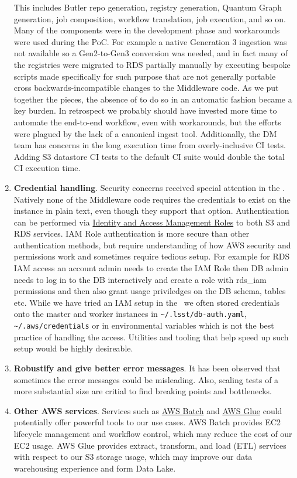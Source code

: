 \begin{enumerate}
This includes Butler repo generation, registry generation, Quantum Graph generation, job composition, workflow translation, job execution, and so on.
Many of the components were in the development phase and workarounds were used during the PoC.
For example a native Generation 3 ingestion was not available so a Gen2-to-Gen3 conversion was needed, and in fact many of the registries were migrated to RDS partially manually by executing bespoke scripts made specifically for such purpose that are not generally portable cross backwards-incompatible changes to the Middleware code.
As we put together the pieces, the absence of to do so in an automatic fashion became a key burden.
In retrospect we probably should have invested more time to automate the end-to-end workflow, even with workarounds, but the efforts were plagued by the lack of a canonical ingest tool.
Additionally, the DM team has concerns in the long execution time from overly-inclusive CI tests.
Adding S3 datastore CI tests to the default CI suite would double the total CI execution time.
\item \textbf{Credential handling}.
Security concerns received special attention in the \poc.
Natively none of the Middleware code requires the credentials to exist on the instance in plain text, even though they support that option.
Authentication can be performed via \href{https://docs.aws.amazon.com/IAM/latest/UserGuide/id_roles.html}{Identity and Access Management Roles} to both S3 and RDS services.
IAM Role authentication is more secure than other authentication methods, but require understanding of how AWS security and permissions work and sometimes require tedious setup.
For example for RDS IAM access an account admin needs to create the IAM Role then DB admin needs to log in to the DB interactively and create a role with rds\_iam permissions and then also grant usage priviledges on the DB schema, tables etc.
While we have tried an IAM setup in the \poc~we often stored credentials onto the master and worker instances in \texttt{\~{}/.lsst/db-auth.yaml}, \texttt{\~{}/.aws/credentials} or in environmental variables which is not the best practice of handling the access.
Utilities and tooling that help speed up such setup would be highly desireable.

\item \textbf{Robustify and give better error messages}.
It has been observed that sometimes the error messages could be misleading.
Also, scaling tests of a more substantial size are critial to find breaking points and bottlenecks.
\item \textbf{Other AWS services}.
Services such as \href{https://aws.amazon.com/batch/}{AWS Batch} and \href{https://aws.amazon.com/glue/}{AWS Glue} could potentially offer powerful tools to our use cases.
AWS Batch provides EC2 lifecycle management and workflow control, which may reduce the cost of our EC2 usage.
AWS Glue provides extract, transform, and load (ETL) services with respect to our S3 storage usage, which may improve our data warehousing experience and form Data Lake.

\end{enumerate}

